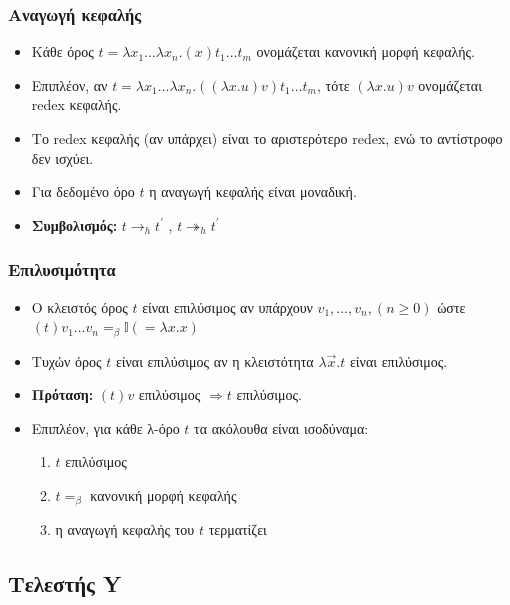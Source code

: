 \documentclass{beamer}
\begin{document}
\begin{frame}
  \frametitle{Αναγωγή κεφαλής}
  \begin{itemize}
  \item Κάθε όρος $t = \lambda x_1 \ldots \lambda x_n . (x) t_1 \ldots
    t_m$ ονομάζεται κανονική μορφή κεφαλής.\pause
  \item Επιπλέον, αν $t = \lambda x_1 \ldots \lambda x_n . ((\lambda x
    . u) v) t_1 \ldots t_m$, τότε $(\lambda x . u) v$ ονομάζεται redex
    κεφαλής.\pause
  \item Το redex κεφαλής (αν υπάρχει) είναι το αριστερότερο redex, ενώ
    το αντίστροφο δεν ισχύει.\pause
  \item Για δεδομένο όρο $t$ η αναγωγή κεφαλής είναι μοναδική.
  \item \textbf{Συμβολισμός:} $t \rightarrow _h t^\prime$ , $t
    \twoheadrightarrow _h t^\prime$
  \end{itemize}
\end{frame}

\begin{frame}
  \frametitle{Επιλυσιμότητα}
  \begin{itemize}
  \item Ο κλειστός όρος $t$ είναι επιλύσιμος αν υπάρχουν $v_1, \ldots,
    v_n, (n \geqslant 0)$ ώστε $ (t) v_1 \ldots v_n =_\beta \mathbb{I}
    (=\lambda x.x) $ \pause
  \item Τυχών όρος $t$ είναι επιλύσιμος αν η κλειστότητα $\lambda
    \overrightarrow{x} . t$ είναι επιλύσιμος. \pause
  \item \textbf{Πρόταση:} $(t) v$ επιλύσιμος $ \Rightarrow t$
    επιλύσιμος. \pause
  \item Επιπλέον, για κάθε λ-όρο $t$ τα ακόλουθα είναι ισοδύναμα:
    \begin{enumerate}
    \item $t$ επιλύσιμος
    \item $t =_\beta$ κανονική μορφή κεφαλής
    \item η αναγωγή κεφαλής του $t$ τερματίζει 	
    \end{enumerate}
  \end{itemize}
\end{frame}

\subsection{Τελεστής Y}
\end{document}
